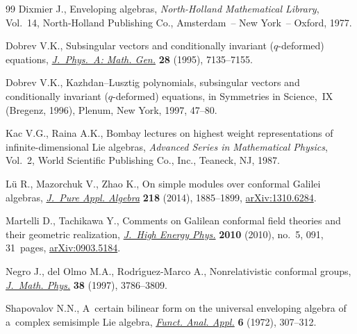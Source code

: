 \documentclass[11pt]{article}
\numberwithin{equation}{section}
\begin{document}
\begin{thebibliography}{99}
Dixmier J., Enveloping algebras, \textit{North-Holland Mathematical Library}, Vol.~14, North-Holland Publishing Co.,
Amsterdam~-- New York~-- Oxford, 1977.

Dobrev V.K., Subsingular vectors and conditionally invariant ({$q$}-deformed) equations,
\href{http://dx.doi.org/10.1088/0305-4470/28/24/014}{\textit{J.~Phys.~A: Math. Gen.}} \textbf{28} (1995), 7135--7155.

Dobrev V.K., Kazhdan--{L}usztig polynomials, subsingular vectors and conditionally invariant ({$q$}-deformed) equations,
in Symmetries in Science,~{IX} ({B}regenz, 1996), Plenum, New York, 1997, 47--80.

Kac V.G., Raina A.K., Bombay lectures on highest weight representations of inf\/inite-dimensional {L}ie algebras,
\textit{Advanced Series in Mathematical Physics}, Vol.~2, World Scientif\/ic Publishing Co., Inc., Teaneck, NJ, 1987.

L{\"u} R., Mazorchuk V., Zhao K., On simple modules over conformal {G}alilei algebras,
\href{http://dx.doi.org/10.1016/j.jpaa.2014.02.012}{\textit{J.~Pure Appl. Algebra}} \textbf{218} (2014), 1885--1899, \href{http://arxiv.org/abs/1310.6284}{arXiv:1310.6284}.

Martelli D., Tachikawa Y., Comments on {G}alilean conformal f\/ield theories and their geometric realization,
\href{http://dx.doi.org/10.1007/JHEP05(2010)091}{\textit{J.~High Energy Phys.}} \textbf{2010} (2010), no.~5, 091,
31~pages, \href{http://arxiv.org/abs/0903.5184}{arXiv:0903.5184}.

Negro J., del Olmo M.A., Rodr{\'{\i}}guez-Marco A., Nonrelativistic conformal groups,
\href{http://dx.doi.org/10.1063/1.532067}{\textit{J.~Math. Phys.}} \textbf{38} (1997), 3786--3809.

Shapovalov N.N., A~certain bilinear form on the universal enveloping algebra of a~complex semisimple {L}ie algebra,
\href{http://dx.doi.org/10.1007/BF01077650}{\textit{Funct. Anal. Appl.}} \textbf{6} (1972), 307--312.

\end{thebibliography}
\end{document}
